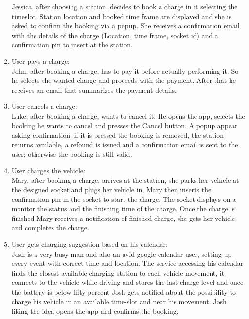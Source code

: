 \begin{enumerate}[label=\textbf{S\arabic*}]
            Jessica, after choosing a station, decides to book a charge in it selecting the timeslot. Station location and booked time frame are displayed and she is asked to confirm the booking via a popup. She receives a confirmation email with the details
            of the charge (Location, time frame, socket id) and a confirmation pin to insert at the station.\label{SCE:user-books-charge}
      \item User pays a charge:\\
            John, after booking a charge, has to pay it before actually performing it. So he selects the wanted charge and proceeds with the payment. After that he receives an email that summarizes the payment details.\label{SCE:user-pays-charge}
      \item User cancels a charge:\\
            Luke, after booking a charge, wants to cancel it. He opens the app, selects the booking he wants to cancel and presses the Cancel button. A popup appear asking confirmation: if it is pressed the booking is removed, the station returns available, a refound is issued and a confirmation email is sent to the user; otherwise the booking is still valid.\label{SCE:user-cancels-charge}
      \item User charges the vehicle:\\
            Mary, after booking a charge, arrives at the station, she parks her vehicle at the designed socket
            and plugs her vehicle in, Mary then inserts the confirmation pin in the socket to start the charge.
            The socket displays on a monitor the status and the finishing time of the charge.
            Once the charge is finished Mary receives a notification of finished charge,
            she gets her vehicle and completes the charge.\label{SCE:user-charges-vehicle}
      \item User gets charging suggestion based on his calendar:\\
            Josh is a very busy man and also an avid google calendar user,
            setting up every event with correct time and location.
            The service accessing his calendar finds the closest available charging station to each vehicle movement,
            it connects to the vehicle while driving and stores the last charge level and once the battery is below fifty percent Josh gets notified
            about the possibility to charge his vehicle in an available time-slot and near his movement.
            Josh liking the idea opens the app and confirms the booking.\label{SCE:user-gets-suggestions}

\end{enumerate}
